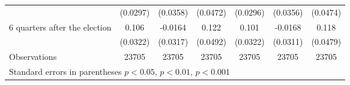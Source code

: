 \begin{table}[!ht]
\begin{tabular}{l*{6}{c}}
                    &    (0.0297)         &    (0.0358)         &    (0.0472)         &    (0.0296)         &    (0.0356)         &    (0.0474)         \\
[0.5em]
 6 quarters after the election&       0.106\sym{**} &     -0.0164         &       0.122\sym{*}  &       0.101\sym{**} &     -0.0168         &       0.118\sym{*}  \\
                    &    (0.0322)         &    (0.0317)         &    (0.0492)         &    (0.0322)         &    (0.0311)         &    (0.0479)         \\
\hline
Observations        &       23705         &       23705         &       23705         &       23705         &       23705         &       23705         \\
\hline\hline
\multicolumn{7}{l}{ Standard errors in parentheses \sym{*} \(p<0.05\), \sym{**} \(p<0.01\), \sym{***} \(p<0.001\)}\\
\end{tabular}
\end{table}
